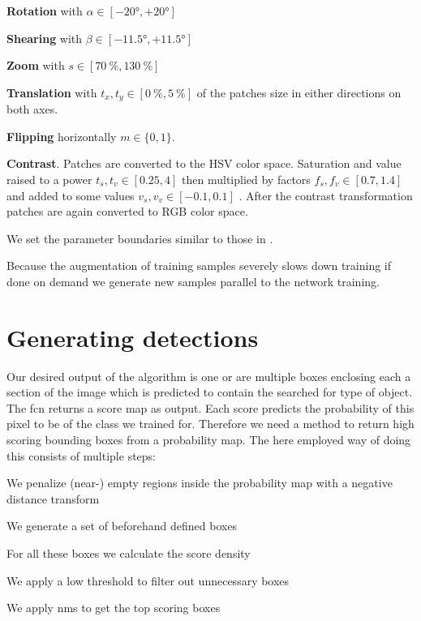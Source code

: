 \begin{my_list_item}
    \item \textbf{Rotation} with $\alpha\in[-\ang{20}, +\ang{20}]$
    \item \textbf{Shearing} with $\beta\in[-\ang{11.5}, + \ang{11.5}]$
    \item \textbf{Zoom} with $s\in[\SI{70}{\percent}, \SI{130}{\percent}]$
    \item \textbf{Translation} with $t_x,t_y\in[\SI{0}{\percent}, \SI{5}{\percent}]$ of the patches size in either directions on both axes.
    \item \textbf{Flipping} horizontally $m\in\{0,1\}$.
    \item \textbf{Contrast}. Patches are converted to the HSV color space. Saturation and value raised to a power $t_s, t_v \in [0.25, 4]$ then multiplied by factors $f_s, f_v \in [0.7, 1.4]$ and added to some values $v_s, v_v \in [-0.1, 0.1]$ \citep{dosovitskiy_discriminative_2014}. After the contrast transformation patches are again converted to RGB color space.
\end{my_list_item}
We set the parameter boundaries similar to those in \citet{dosovitskiy_discriminative_2014}.

Because the augmentation of training samples severely slows down training if done on demand we generate new samples parallel to the network training.


\section{Generating detections}
\label{sec:pipeline:eval}
Our desired output of the algorithm is one or are multiple boxes enclosing each a section of the image which is predicted to contain the searched for type of object. The \gls{fcn} returns a score map as output. Each score predicts the probability of this pixel to be of the class we trained for. Therefore we need a method to return high scoring bounding boxes from a probability map. The here employed way of doing this consists of multiple steps:\\
\begin{my_list_num}
    \item We penalize (near-) empty regions inside the probability map with a negative distance transform
    \item We generate a set of beforehand defined boxes
    \item For all these boxes we calculate the score density
    \item We apply a low threshold to filter out unnecessary boxes
    \item We apply \gls{nms} to get the top scoring boxes
\end{my_list_num}

